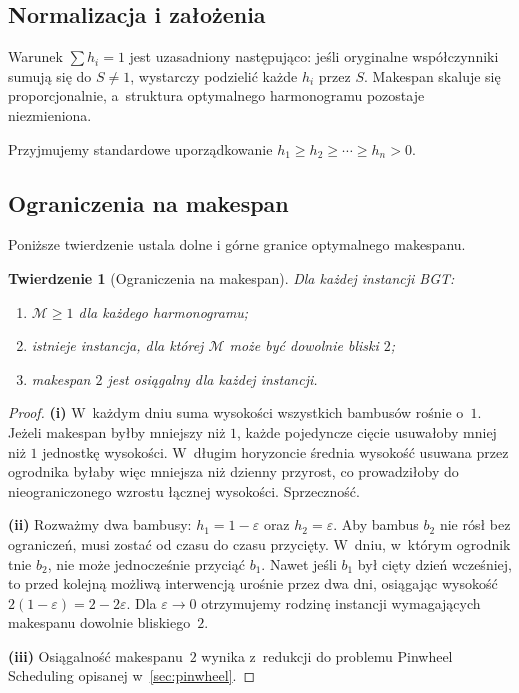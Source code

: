 \documentclass[12pt,a4paper]{article}
\theoremstyle{plain}
\newtheorem{twierdzenie}{Twierdzenie}[section]
\theoremstyle{definition}
\theoremstyle{remark}
\newcommand{\makespan}{\mathcal{M}}
\begin{document}
\subsection{Normalizacja i założenia}

Warunek $\sum h_i = 1$ jest uzasadniony następująco: jeśli oryginalne
współczynniki sumują się do $S \neq 1$, wystarczy podzielić każde $h_i$
przez $S$. Makespan skaluje się proporcjonalnie, a~struktura optymalnego
harmonogramu pozostaje niezmieniona.

Przyjmujemy standardowe uporządkowanie $h_1 \geq h_2 \geq \cdots \geq h_n > 0$.

\subsection{Ograniczenia na makespan}

Poniższe twierdzenie ustala dolne i górne granice optymalnego makespanu.

\begin{twierdzenie}[Ograniczenia na makespan]\label{thm:bounds}
Dla każdej instancji BGT:
\begin{enumerate}[label=(\roman*), noitemsep]
  \item $\makespan \geq 1$ dla każdego harmonogramu;
  \item istnieje instancja, dla której $\makespan$ może być dowolnie bliski $2$;
  \item makespan $2$ jest osiągalny dla każdej instancji.
\end{enumerate}
\end{twierdzenie}

\begin{proof}
\textbf{(i)} W~każdym dniu suma wysokości wszystkich bambusów rośnie
o~$1$. Jeżeli makespan byłby mniejszy niż $1$, każde pojedyncze cięcie
usuwałoby mniej niż $1$ jednostkę wysokości. W~długim horyzoncie średnia
wysokość usuwana przez ogrodnika byłaby więc mniejsza niż dzienny przyrost,
co prowadziłoby do nieograniczonego wzrostu łącznej wysokości. Sprzeczność.

\textbf{(ii)} Rozważmy dwa bambusy: $h_1 = 1-\varepsilon$ oraz
$h_2 = \varepsilon$. Aby bambus $b_2$ nie rósł bez ograniczeń, musi zostać
od czasu do czasu przycięty. W~dniu, w~którym ogrodnik tnie $b_2$, nie może
jednocześnie przyciąć $b_1$. Nawet jeśli $b_1$ był cięty dzień wcześniej,
to przed kolejną możliwą interwencją urośnie przez dwa dni, osiągając
wysokość $2(1-\varepsilon) = 2-2\varepsilon$. Dla $\varepsilon \to 0$
otrzymujemy rodzinę instancji wymagających makespanu dowolnie bliskiego~$2$.

\textbf{(iii)} Osiągalność makespanu~$2$ wynika z~redukcji do problemu
Pinwheel Scheduling opisanej w~\cref{sec:pinwheel}.
\end{proof}
\end{document}

